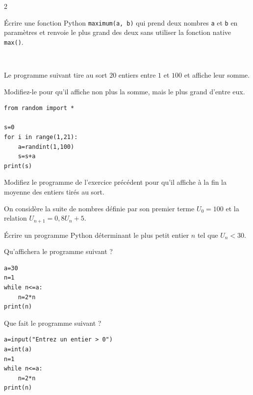 {\begin{multicols}{2}
	  \begin{exo}
		  Écrire une fonction Python \lstinline|maximum(a, b)| qui prend deux nombres \lstinline|a| et \lstinline|b| en paramètres et renvoie le plus grand des deux sans utiliser la fonction native \lstinline|max()|.
	  \end{exo}

	  \vfill~\columnbreak

	  \begin{exo}{}
		  Le programme suivant tire au sort $20$ entiers entre $1$ et $100$ et affiche leur somme.

		  Modifiez-le pour qu'il affiche non plus la somme, mais le plus grand d'entre eux.

		  \begin{lstlisting}
from random import *

s=0
for i in range(1,21):
    a=randint(1,100)
    s=s+a
print(s)
\end{lstlisting}
	  \end{exo}

	  \begin{exo}{}
		  Modifiez le programme de l'exercice précédent pour qu'il affiche à la fin la moyenne des entiers tirés au sort.
	  \end{exo}

	  \begin{exo}
		  On considère la suite de nombres définie par son premier terme $U_0 = 100$ et la relation $U_{n+1} = 0{,}8 U_n + 5$.

		  Écrire un programme Python déterminant le plus petit entier $n$ tel que $U_n < 30$.
	  \end{exo}

	  \begin{exo}{}
		  Qu'affichera le programme suivant ?

		  \begin{lstlisting}
a=30
n=1
while n<=a:
    n=2*n
print(n)
\end{lstlisting}
	  \end{exo}

	  \begin{exo}{}
		  Que fait le programme suivant ?

		  \begin{lstlisting}
a=input("Entrez un entier > 0")
a=int(a)
n=1
while n<=a:
    n=2*n
print(n)
\end{lstlisting}
	  \end{exo}


\end{multicols}}
